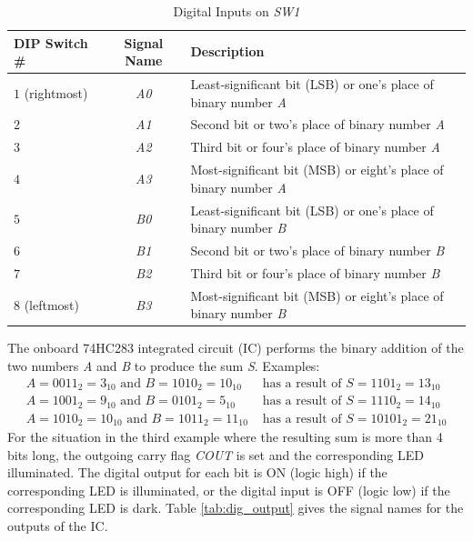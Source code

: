 \documentclass[11pt,oneside]{article}
\begin{document}
\begin{table}[!htb]
	\centering
	\caption{Digital Inputs on \textit{SW1}}
	\begin{tabular}{l | c | l}
		\hline
		DIP Switch \# & Signal Name & Description \\
		\hline
		$1$ (rightmost) & \textit{A0} & Least-significant bit (LSB) or one's place of binary number \textit{A} \\
		$2$ & \textit{A1} & Second bit or two's place of binary number \textit{A} \\
		$3$ & \textit{A2} & Third bit or four's place of binary number \textit{A} \\
		$4$ & \textit{A3} & Most-significant bit (MSB) or eight's place of binary number \textit{A}  \\
		$5$ & \textit{B0} & Least-significant bit (LSB) or one's place of binary number \textit{B} \\
		$6$ & \textit{B1} & Second bit or two's place of binary number \textit{B} \\
		$7$ & \textit{B2} & Third bit or four's place of binary number \textit{B} \\
		$8$ (leftmost) & \textit{B3} & Most-significant bit (MSB) or eight's place of binary number \textit{B} \\
		\hline
	\end{tabular}
	\label{tab:dig_input}
\end{table}

The onboard 74HC283 integrated circuit (IC) performs the binary addition of the two numbers \textit{A} and \textit{B} to produce the sum \textit{S}. Examples:
\begin{align*}
	A = 0011_{2} = 3_{10} \text{ and } B = 1010_{2} = 10_{10} &\text{ has a result of } S = 1101_{2} = 13_{10} \\
	A = 1001_{2} = 9_{10} \text{ and } B = 0101_{2} = 5_{10} &\text{ has a result of } S = 1110_{2} = 14_{10} \\
	A = 1010_{2} = 10_{10} \text{ and } B = 1011_{2} = 11_{10} &\text{ has a result of } S = 10101_{2} = 21_{10}
\end{align*}
For the situation in the third example where the resulting sum is more than 4 bits long, the outgoing carry flag \textit{COUT} is set and the corresponding LED illuminated. The digital output for each bit is ON (logic high) if the corresponding LED is illuminated, or the digital input is OFF (logic low) if the corresponding LED is dark. Table \ref{tab:dig_output} gives the signal names for the outputs of the IC.
\end{document}
